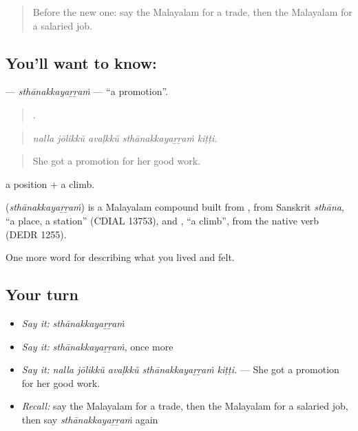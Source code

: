 \label{lesson:ML-C542-sthanakkayarram}



\begin{quote}
Before the new one: say the Malayalam for a trade, then the Malayalam for a salaried job.
\end{quote}

\subsection*{You'll want to know: }
\textbf{} — \emph{sthānakkayaṟṟaṁ} — \textquotedblleft{}a promotion\textquotedblright{}.

\begin{quote}
    .
\end{quote}

\begin{quote}
\emph{nalla jōlikkŭ avaḷkkŭ sthānakkayaṟṟaṁ kiṭṭi.}
\end{quote}

\begin{quote}
She got a promotion for her good work.
\end{quote}

 a position +  a climb.

\begin{cousinweb}
\textbf{} (\emph{sthānakkayaṟṟaṁ}) is a Malayalam compound built from , from Sanskrit \emph{sthāna}, \textquotedblleft{}a place, a station\textquotedblright{} (CDIAL 13753), and , \textquotedblleft{}a climb\textquotedblright{}, from the native verb  (DEDR 1255).
\end{cousinweb}

\begin{grammarlens}[title={What you've built}]
One more word for describing what you lived and felt.
\end{grammarlens}

\subsection*{Your turn}
\begin{itemize}
\raggedright
  \item \emph{Say it:} \emph{sthānakkayaṟṟaṁ}
  \item \emph{Say it:} \emph{sthānakkayaṟṟaṁ}, once more
  \item \emph{Say it:} \emph{nalla jōlikkŭ avaḷkkŭ sthānakkayaṟṟaṁ kiṭṭi.} — She got a promotion for her good work.
  \item \emph{Recall:} say the Malayalam for a trade, then the Malayalam for a salaried job, then say \emph{sthānakkayaṟṟaṁ} again
\end{itemize}

